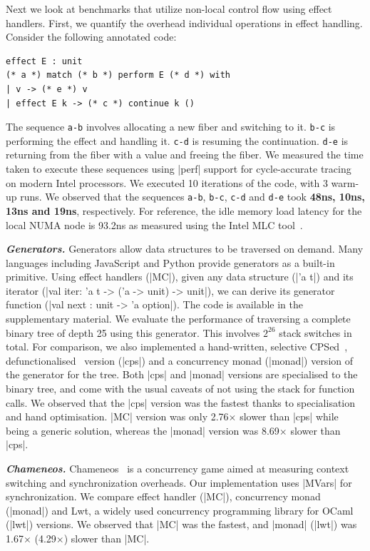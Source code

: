 \documentclass[sigplan,10pt,review,anonymous]{acmart}\settopmatter{printfolios=true,printccs=false,printacmref=false}
\begin{document}
Next we look at benchmarks that utilize non-local control flow using effect
handlers. First, we quantify the overhead individual operations in effect
handling. Consider the following annotated code:
\begin{lstlisting}
effect E : unit
(* a *) match (* b *) perform E (* d *) with
| v -> (* e *) v
| effect E k -> (* c *) continue k ()
\end{lstlisting}
The sequence \texttt{a-b} involves allocating a new fiber and switching to it.
\texttt{b-c} is performing the effect and handling it. \texttt{c-d} is resuming
the continuation. \texttt{d-e} is returning from the fiber with a value and
freeing the fiber. We measured the time taken to execute these sequences using
|perf| support for cycle-accurate tracing on modern Intel processors. We
executed 10 iterations of the code, with 3 warm-up runs. We observed that the
sequences \texttt{a-b}, \texttt{b-c}, \texttt{c-d} and \texttt{d-e} took
\textbf{48ns, 10ns, 13ns and 19ns}, respectively. For reference, the idle
memory load latency for the local NUMA node is 93.2ns as measured using the
Intel MLC tool~\cite{mlc}.

\textbf{\textit{Generators.}} Generators allow data structures to be traversed on
demand. Many languages including JavaScript and Python provide generators as a
built-in primitive. Using effect handlers (|MC|), given any data structure
(|'a t|) and its iterator (|val iter: 'a t -> ('a -> unit) -> unit|), we can
derive its generator function (|val next : unit -> 'a option|). The code is
available in the supplementary material. We evaluate the performance of
traversing a complete binary tree of depth 25 using this generator. This
involves $2^{26}$ stack switches in total. For comparison, we also implemented
a hand-written, selective CPSed~\cite{Nielson01},
defunctionalised~\cite{Danvy01} version (|cps|) and a concurrency monad
(|monad|) version of the generator for the tree. Both |cps| and |monad|
versions are specialised to the binary tree, and come with the usual caveats of
not using the stack for function calls. We observed that the |cps| version was
the fastest thanks to specialisation and hand optimisation. |MC| version was
only 2.76$\times$ slower than |cps| while being a generic
solution, whereas the |monad| version was 8.69$\times$ slower than |cps|.

\textbf{\textit{Chameneos.}} Chameneos~\cite{Chameneos} is a concurrency game
aimed at measuring context switching and synchronization overheads. Our
implementation uses |MVars| for synchronization. We compare effect handler
(|MC|), concurrency monad (|monad|) and Lwt, a widely used concurrency
programming library for OCaml (|lwt|) versions. We observed that |MC| was the
fastest, and |monad| (|lwt|) was 1.67$\times$ (4.29$\times$) slower than |MC|.
\end{document}
